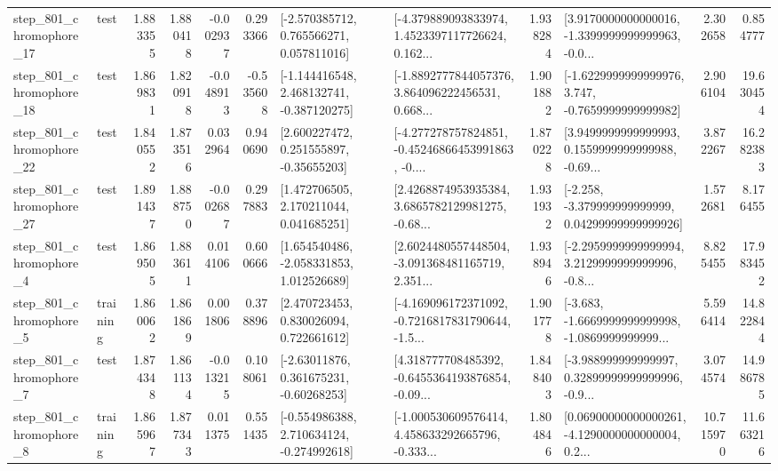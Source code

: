 \begin{tabular}{llrrrrllrlrr}
  step\_801\_chromophore\_17 &      test &      1.883355 &    1.880418 &     -0.002937 &  0.293366 &    [-2.570385712, 0.765566271, 0.057811016] &  [-4.379889093833974, 1.4523397117726624, 0.162... &       1.938284 &  [3.9170000000000016, -1.3399999999999963, -0.0... &            2.302658 &          0.854777 \\
  step\_801\_chromophore\_18 &      test &      1.869831 &    1.820918 &     -0.048913 & -0.535608 &   [-1.144416548, 2.468132741, -0.387120275] &  [-1.8892777844057376, 3.864096222456531, 0.668... &       1.901882 &  [-1.6229999999999976, 3.747, -0.7659999999999982] &            2.906104 &         19.630454 \\
  step\_801\_chromophore\_22 &      test &      1.840552 &    1.873516 &      0.032964 &  0.940690 &     [2.600227472, 0.251555897, -0.35655203] &  [-4.277278757824851, -0.45246866453991863, -0.... &       1.870228 &  [3.9499999999999993, 0.1559999999999988, -0.69... &            3.872267 &         16.282383 \\
  step\_801\_chromophore\_27 &      test &      1.891437 &    1.888750 &     -0.002687 &  0.297883 &     [1.472706505, 2.170211044, 0.041685251] &  [2.4268874953935384, 3.6865782129981275, -0.68... &       1.931932 &  [-2.258, -3.379999999999999, 0.04299999999999926] &            1.572681 &          8.176455 \\
   step\_801\_chromophore\_4 &      test &      1.869505 &    1.883611 &      0.014106 &  0.600666 &    [1.654540486, -2.058331853, 1.012526689] &  [2.6024480557448504, -3.091368481165719, 2.351... &       1.938946 &  [-2.2959999999999994, 3.2129999999999996, -0.8... &            8.825455 &         17.983452 \\
   step\_801\_chromophore\_5 &  training &      1.860062 &    1.861869 &      0.001806 &  0.378896 &     [2.470723453, 0.830026094, 0.722661612] &  [-4.169096172371092, -0.7216817831790644, -1.5... &       1.901778 &  [-3.683, -1.6669999999999998, -1.0869999999999... &            5.596414 &         14.822844 \\
   step\_801\_chromophore\_7 &      test &      1.874348 &    1.861134 &     -0.013215 &  0.108061 &     [-2.63011876, 0.361675231, -0.60268253] &  [4.318777708485392, -0.6455364193876854, -0.09... &       1.848403 &  [-3.988999999999997, 0.32899999999999996, -0.9... &            3.074574 &         14.986785 \\
   step\_801\_chromophore\_8 &  training &      1.865967 &    1.877343 &      0.011375 &  0.551435 &   [-0.554986388, 2.710634124, -0.274992618] &  [-1.000530609576414, 4.458633292665796, -0.333... &       1.804846 &  [0.06900000000000261, -4.1290000000000004, 0.2... &           10.715970 &         11.663216 \\

\end{tabular}
